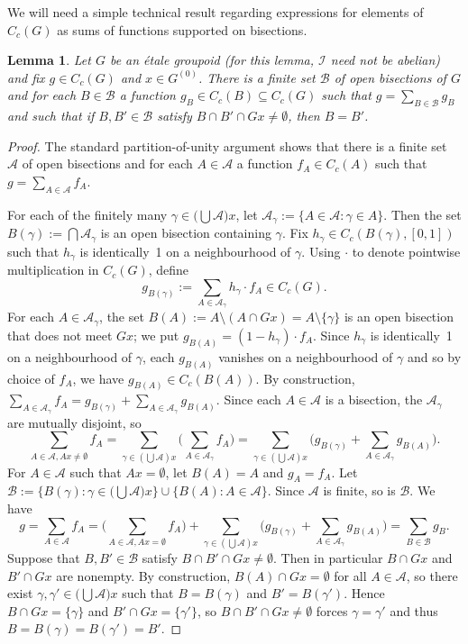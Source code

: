 \documentclass[a4paper, 12pt]{amsart}
\theoremstyle{plain}
\newtheorem{lemma}[theorem]{Lemma}
\theoremstyle{definition}
\theoremstyle{remark}
\newcommand{\Aa}{\mathcal{A}}
\newcommand{\Bb}{\mathcal{B}}
\newcommand{\Ii}{\mathcal{I}}
\numberwithin{equation}{section}
\begin{document}
We will need a simple technical result regarding expressions for elements of
$C_c(G)$ as sums of functions supported on bisections.

\begin{lemma}\label{lem:can rewrite g}
Let $G$ be an \'etale groupoid (for this lemma, $\Ii$ need not be abelian) and fix $g \in C_c(G)$ and $x \in G^{(0)}$.
There is a finite set $\Bb$ of open bisections of $G$ and for each $B \in
\Bb$ a function $g_B \in C_c(B) \subseteq C_c(G)$ such that $g = \sum_{B \in
\Bb} g_B$ and such that if $B, B' \in \Bb$ satisfy $B \cap B' \cap
Gx
\not=
\emptyset$, then $B = B'$.
\end{lemma}
\begin{proof}
The standard partition-of-unity argument shows that there is a finite set
$\Aa$ of open bisections and for each $A \in \Aa$ a function $f_A \in C_c(A)$
such that $g = \sum_{A \in \Aa} f_A$.

For each of the finitely many $\gamma \in \big(\bigcup \Aa\big) x$, let
$\Aa_\gamma := \{A \in \Aa : \gamma \in A\}$. Then
the set
$B(\gamma) := \bigcap \Aa_\gamma$ is an open bisection containing $\gamma$. Fix
$h_\gamma \in C_c(B(\gamma), [0,1])$ such that $h_\gamma$ is identically~1 on a
neighbourhood of $\gamma$. Using $\cdot$ to denote pointwise multiplication in
$C_c(G)$, define
\[
g_{B(\gamma)} := \sum_{A \in \Aa_\gamma} h_\gamma\cdot f_A \in C_c(G).
\]
For each $A \in \Aa_\gamma$, the set $B(A) :=	A\setminus ( A\cap Gx) =
A\setminus\{\gamma\}$ is an open bisection that does not meet $Gx$; we put
$g_{B(A)} = (1 - h_\gamma)\cdot f_A$. Since $h_\gamma$ is identically~1 on a
neighbourhood of $\gamma$, each $g_{B(A)}$ vanishes on a neighbourhood of
$\gamma$ and so by choice of $f_A$, we have $g_{B(A)} \in C_c(B(A))$. By
construction, $\sum_{A \in \Aa_\gamma} f_A = g_{B(\gamma)} + \sum_{A \in
\Aa_\gamma} g_{B(A)}$. Since each $A \in \Aa$ is a bisection, the
$\Aa_\gamma$ are mutually disjoint, so
\[
\sum_{A \in \Aa, Ax \not= \emptyset} f_A
    = \sum_{\gamma \in (\bigcup \Aa)x}\Big(\sum_{A \in \Aa_\gamma} f_A\Big)
    = \sum_{\gamma \in (\bigcup \Aa)x} \Big(g_{B(\gamma)} + \sum_{A \in \Aa_\gamma} g_{B(A)}\Big).
\]
For $A \in \Aa$ such that $A x = \emptyset$, let $B(A) = A$ and $g_A = f_A$.
Let $\Bb := \{B(\gamma) : \gamma \in \big(\bigcup \Aa\big) x\} \cup \{B(A) :
A \in \Aa\}$. Since $\Aa$ is finite, so is $\Bb$. We have
\[
g = \sum_{A \in \Aa} f_A
    =
    \Big(\sum_{A \in \Aa, Ax = \emptyset} f_A\Big)
    +
    \sum_{\gamma \in (\bigcup \Aa)x} \Big(g_{B(\gamma)} + \sum_{A \in \Aa_\gamma} g_{B(A)}\Big)
    = \sum_{B \in \Bb} g_B.
\]
Suppose that $B, B' \in \Bb$ satisfy $B \cap B' \cap
Gx
 \not= \emptyset$.
Then in particular $B \cap Gx
$ and $B' \cap Gx
$ are nonempty. By
construction, $B(A) \cap Gx
 = \emptyset$ for all $A \in \Aa$, so there exist
$\gamma,\gamma' \in \big(\bigcup \Aa\big) x$ such that $B = B(\gamma)$ and $B'
= B(\gamma')$. Hence
$B \cap Gx = \{\gamma\}$ and $B' \cap Gx =
\{\gamma'\}$, so $B \cap B' \cap G x \not= \emptyset$ forces $\gamma =
\gamma'$  and thus
$B = B(\gamma) = B(\gamma') = B'$.
\end{proof}
\end{document}
